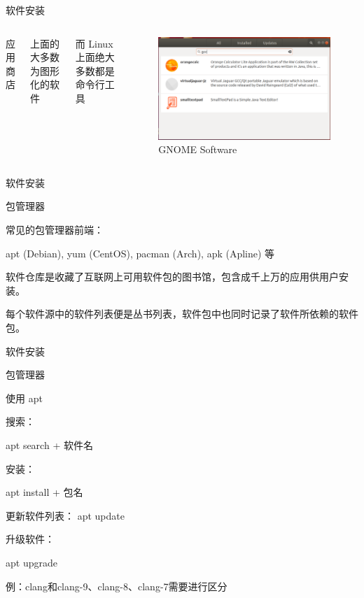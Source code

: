 \documentclass[UTF8]{ctexbeamer}
\begin{document}
\begin{frame}{软件安装}

    \begin{columns}
    
        
        应用商店
        
        上面的大多数为图形化的软件
        
        而 Linux 上面绝大多数都是命令行工具
        
        \begin{figure}
            \centering
            \includegraphics[width=\textwidth]{gnome-gcc.png}
            \caption{GNOME Software}
        \end{figure}
    \end{columns}
    
\end{frame}

\begin{frame}{软件安装}

    包管理器

    常见的包管理器前端：
    
    apt (Debian), yum (CentOS), pacman (Arch), apk (Apline) 等
    
    软件仓库是收藏了互联网上可用软件包的图书馆，包含成千上万的应用供用户安装。
    
    每个软件源中的软件列表便是丛书列表，软件包中也同时记录了软件所依赖的软件包。

\end{frame}

\begin{frame}{软件安装}

    包管理器
    
    使用 apt
    
    搜索：
    
    apt search + 软件名
    
    安装：
    
    apt install + 包名
    
    更新软件列表： apt update
    
    升级软件：
    
    apt upgrade
    
    例：clang和clang-9、clang-8、clang-7需要进行区分

\end{frame}
\end{document}
